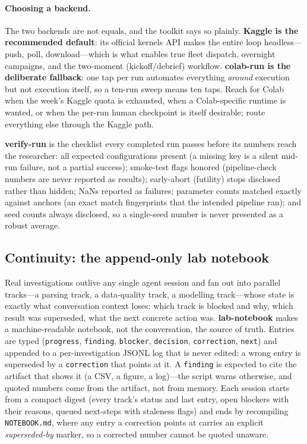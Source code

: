 \documentclass[11pt]{article}
\begin{document}
\paragraph{Choosing a backend.} The two backends are not equals, and the
toolkit says so plainly. \textbf{Kaggle is the recommended default}: its
official kernels API makes the entire loop headless---push, poll,
download---which is what enables true fleet dispatch, overnight campaigns,
and the two-moment (kickoff/debrief) workflow. \textbf{colab-run is the
deliberate fallback}: one tap per run automates everything \emph{around}
execution but not execution itself, so a ten-run sweep means ten taps.
Reach for Colab when the week's Kaggle quota is exhausted, when a
Colab-specific runtime is wanted, or when the per-run human checkpoint is
itself desirable; route everything else through the Kaggle path.

\textbf{verify-run} is the checklist every completed run passes before its
numbers reach the researcher: all expected configurations present (a missing
key is a silent mid-run failure, not a partial success); smoke-test flags
honored (pipeline-check numbers are never reported as results); early-abort
(futility) stops disclosed rather than hidden; NaNs reported as failures;
parameter counts matched exactly against anchors (an exact match fingerprints
that the intended pipeline ran); and seed counts always disclosed, so a
single-seed number is never presented as a robust average.

\subsection{Continuity: the append-only lab notebook}
\label{sec:notebook}

Real investigations outlive any single agent session and fan out into parallel
tracks---a parsing track, a data-quality track, a modelling track---whose state
is exactly what conversation context loses: which track is blocked and why,
which result was superseded, what the next concrete action was.
\textbf{lab-notebook} makes a machine-readable notebook, not the conversation,
the source of truth. Entries are typed (\texttt{progress}, \texttt{finding},
\texttt{blocker}, \texttt{decision}, \texttt{correction}, \texttt{next}) and
appended to a per-investigation JSONL log that is never edited: a wrong entry
is superseded by a \texttt{correction} that points at it. A \texttt{finding} is
expected to cite the artifact that shows it (a CSV, a figure, a log)---the
script warns otherwise, and quoted numbers come from the artifact, not from
memory. Each session starts from a compact digest (every track's status and
last entry, open blockers with their reasons, queued next-steps with staleness
flags) and ends by recompiling \texttt{NOTEBOOK.md}, where any entry a
correction points at carries an explicit \emph{superseded-by} marker, so a
corrected number cannot be quoted unaware.
\end{document}
